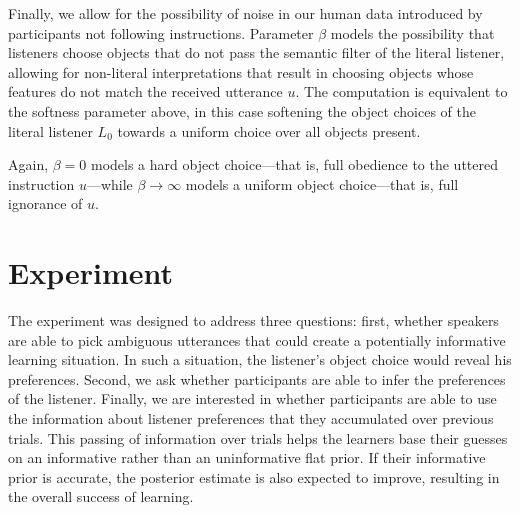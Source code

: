 \documentclass[10pt,a4paper]{article}
\begin{document}


Finally, we allow for the possibility of noise in our human data introduced by participants not following instructions.
Parameter $\beta$ models the possibility that listeners choose objects that do not pass the semantic filter of the literal listener, allowing for non-literal interpretations that result in choosing objects whose features do not match the received utterance $u$. 
The computation is equivalent to the softness parameter above, in this case softening the object choices of the literal listener $L_0$ towards a uniform choice over all objects present. 

Again, $\beta=0$ models a hard object choice---that is, full obedience to the uttered instruction $u$---while $\beta \rightarrow \infty$ models a uniform object choice---that is, full ignorance of $u$.

\section{Experiment}

The experiment was designed to address three questions: first, whether speakers are able to pick ambiguous utterances that could create a potentially informative learning situation. In such a situation, the listener's object choice would reveal his preferences. Second, we ask whether participants are able to infer the preferences of the listener. Finally, we are interested in whether participants are able to use the information about listener preferences that they accumulated over previous trials. This passing of information over trials helps the learners base their guesses on an informative rather than an uninformative flat prior. If their informative prior is accurate, the posterior estimate is also expected to improve, resulting in the overall success of learning.
\end{document}
